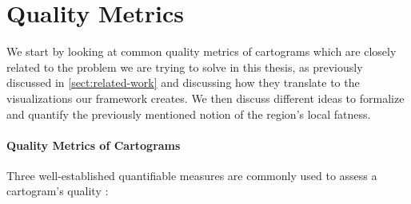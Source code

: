 \section{Quality Metrics}
\label{sect:quality-metrics}

We start by looking at common quality metrics of cartograms \emdash{} which are closely related to the problem we are trying to solve in this thesis, as previously discussed in \cref{sect:related-work} \emdash{} and discussing how they translate to the visualizations our framework creates.
We then discuss different ideas to formalize and quantify the previously mentioned notion of the region's local fatness.



\paragraph{Quality Metrics of Cartograms}

Three well-established quantifiable measures are commonly used to assess a cartogram's quality \cite{alam2015quantitative} \cite{nusrat2018evaluating}:

